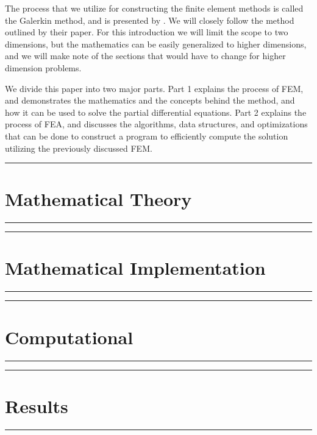 \documentclass[10pt]{armath}
\numberwithin{equation}{section}
\theoremstyle{definition}
\newcommand{\hdiv}[3]{
  \vspace{#1}%
  \noindent\rule{\textwidth}{#2}%
  \vspace{#3}%
}
\begin{document}
The process that we utilize for constructing the finite element methods is
called the Galerkin method, and is presented by \cite{KH}. We will closely
follow the method outlined by their paper. For this introduction we will limit
the scope to two dimensions, but the mathematics can be easily generalized to
higher dimensions, and we will make note of the sections that would have to
change for higher dimension problems.

We divide this paper into two major parts. Part 1 explains the process of FEM,
and demonstrates the mathematics and the concepts behind the method, and how it
can be used to solve the partial differential equations. Part 2 explains the
process of FEA, and discusses the algorithms, data structures, and
optimizations that can be done to construct a program to efficiently compute
the solution utilizing the previously discussed FEM.

\newpage
\hdiv{10pt}{0.5pt}{1pt}
\part{Mathematical Theory}%
\label{prt:mathematical_theory}
\hdiv{1pt}{0.5pt}{10pt}







\newpage
\hdiv{10pt}{0.5pt}{1pt}
\part{Mathematical Implementation}%
\label{prt:mathematical_implementation}
\hdiv{1pt}{0.5pt}{10pt}









\newpage
\hdiv{10pt}{0.5pt}{1pt}
\part{Computational}%
\label{prt:computational}
\hdiv{1pt}{0.5pt}{10pt}








\newpage
\hdiv{10pt}{0.5pt}{1pt}
\part{Results}%
\label{prt:results}
\hdiv{1pt}{0.5pt}{10pt}
\end{document}
